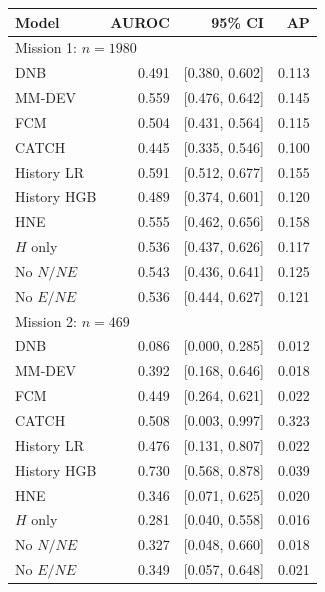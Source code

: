 \begin{tabular*}{\linewidth}{@{\extracolsep{\fill}}lrrr@{}}
\toprule
Model & AUROC & 95\% CI & AP \\
\midrule
\multicolumn{4}{l}{Mission 1: $n=1980$} \\
\midrule
DNB & 0.491 & [0.380, 0.602] & 0.113 \\
MM-DEV & 0.559 & [0.476, 0.642] & 0.145 \\
FCM & 0.504 & [0.431, 0.564] & 0.115 \\
CATCH & 0.445 & [0.335, 0.546] & 0.100 \\
History LR & 0.591 & [0.512, 0.677] & 0.155 \\
History HGB & 0.489 & [0.374, 0.601] & 0.120 \\
HNE & 0.555 & [0.462, 0.656] & 0.158 \\
$H$ only & 0.536 & [0.437, 0.626] & 0.117 \\
No $N/NE$ & 0.543 & [0.436, 0.641] & 0.125 \\
No $E/NE$ & 0.536 & [0.444, 0.627] & 0.121 \\
\midrule
\multicolumn{4}{l}{Mission 2: $n=469$} \\
\midrule
DNB & 0.086 & [0.000, 0.285] & 0.012 \\
MM-DEV & 0.392 & [0.168, 0.646] & 0.018 \\
FCM & 0.449 & [0.264, 0.621] & 0.022 \\
CATCH & 0.508 & [0.003, 0.997] & 0.323 \\
History LR & 0.476 & [0.131, 0.807] & 0.022 \\
History HGB & 0.730 & [0.568, 0.878] & 0.039 \\
HNE & 0.346 & [0.071, 0.625] & 0.020 \\
$H$ only & 0.281 & [0.040, 0.558] & 0.016 \\
No $N/NE$ & 0.327 & [0.048, 0.660] & 0.018 \\
No $E/NE$ & 0.349 & [0.057, 0.648] & 0.021 \\
\bottomrule
\end{tabular*}